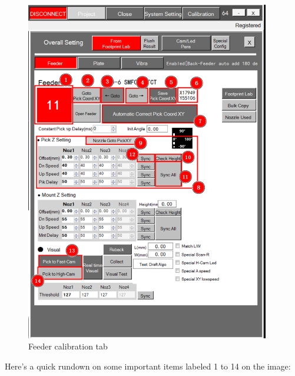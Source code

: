 \documentclass[a4paper,10pt]{report}
\begin{document}
\begin{figure}[!htb]
 \centering
 \includegraphics[width=0.95\textwidth]{images/scrot21.png}
 \caption{Feeder calibration tab}
\end{figure}
\newpage
Here's a quick rundown on some important items labeled 1 to 14 on the image:\\
\end{document}
